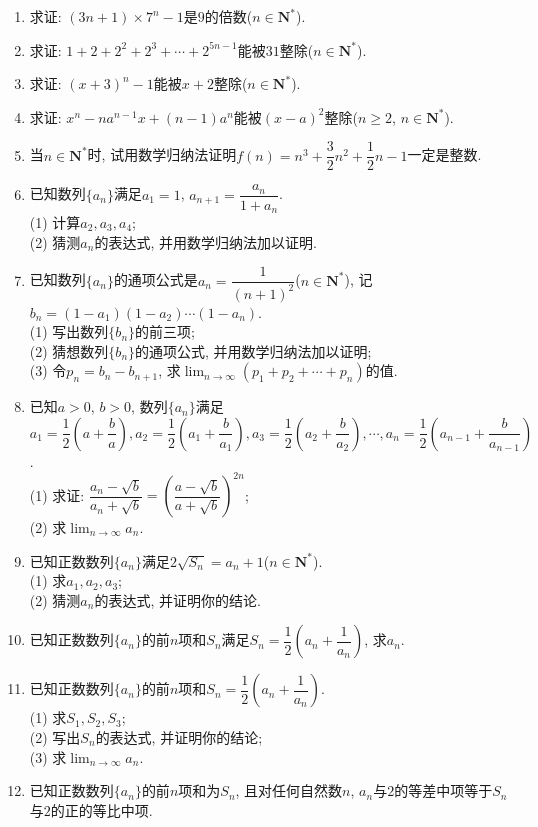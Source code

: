 \documentclass[10pt,a4paper]{article}
\begin{document}
\begin{enumerate}[1.]
\item 求证: $(3n+1)\times 7^n-1$是$9$的倍数($n\in \mathbf{N}^*$).
\item 求证: $1+2+2^2+2^3+\cdots +2^{5n-1}$能被$31$整除($n\in \mathbf{N}^*$).
\item 求证: $(x+3)^n-1$能被$x+2$整除($n\in \mathbf{N}^*$).
\item 求证: $x^n-na^{n-1}x+(n-1)a^n$能被$(x-a)^2$整除($n\ge 2$, $n\in \mathbf{N}^*$).
\item 当$n\in \mathbf{N}^*$时, 试用数学归纳法证明$f(n)=n^3+\dfrac 32n^2+\dfrac 12n-1$一定是整数.
\item 已知数列$\{a_n\}$满足$a_1=1$, $a_{n+1}=\dfrac{a_n}{1+{a_n}}$.\\
(1) 计算$a_2,a_3,a_4$;\\
(2) 猜测$a_n$的表达式, 并用数学归纳法加以证明.
\item 已知数列$\{a_n\}$的通项公式是$a_n=\dfrac 1{(n+1)^2}$($n\in \mathbf{N}^*$), 记$b_n=(1-a_1)(1-a_2)\cdots (1-a_n)$.\\
(1) 写出数列$\{b_n\}$的前三项;\\
(2) 猜想数列$\{b_n\}$的通项公式, 并用数学归纳法加以证明;\\
(3) 令$p_n=b_n-b_{n+1}$, 求$\displaystyle \lim_{n\to \infty} (p_1+p_2+\cdots +p_n)$的值.
\item 已知$a>0$, $b>0$, 数列$\{a_n\}$满足$a_1=\dfrac 12(a+\dfrac ba),a_2=\dfrac 12(a_1+\dfrac b{a_1}),a_3=\dfrac 12(a_2+\dfrac b{a_2}),\cdots,a_n=\dfrac 12(a_{n-1}+\dfrac b{a_{n-1}})$.\\
(1) 求证: $\dfrac{{a_n}-\sqrt b}{{a_n}+\sqrt b}=(\dfrac{a-\sqrt b}{a+\sqrt b})^{2n}$;\\
(2) 求$\displaystyle \lim_{n\to \infty} a_n$.
\item 已知正数数列$\{a_n\}$满足$2\sqrt {S_n}=a_n+1$($n\in \mathbf{N}^*$).\\
(1) 求$a_1,a_2,a_3$;\\
(2) 猜测$a_n$的表达式, 并证明你的结论.
\item 已知正数数列$\{a_n\}$的前$n$项和$S_n$满足$S_n=\dfrac 12(a_n+\dfrac 1{a_n})$, 求$a_n$.
\item 已知正数数列$\{a_n\}$的前$n$项和$S_n=\dfrac 12(a_n+\dfrac 1{a_n})$.\\
(1) 求$S_1,S_2,S_3$;\\
(2) 写出$S_n$的表达式, 并证明你的结论;\\
(3) 求$\displaystyle \lim_{n\to \infty} a_n$.
\item 已知正数数列$\{a_n\}$的前$n$项和为$S_n$, 且对任何自然数$n$, $a_n$与$2$的等差中项等于$S_n$与$2$的正的等比中项.\\

\end{enumerate}
\end{document}
